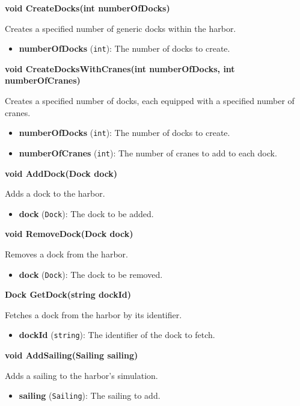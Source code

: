 \documentclass[12pt]{article}
\begin{document}
\textbf{void CreateDocks(int numberOfDocks)}

Creates a specified number of generic docks within the harbor.

\begin{itemize}
    \item \textbf{numberOfDocks} (\texttt{int}): The number of docks to create.
\end{itemize}

\textbf{void CreateDocksWithCranes(int numberOfDocks, int numberOfCranes)}

Creates a specified number of docks, each equipped with a specified number of cranes.

\begin{itemize}
    \item \textbf{numberOfDocks} (\texttt{int}): The number of docks to create.
    \item \textbf{numberOfCranes} (\texttt{int}): The number of cranes to add to each dock.
\end{itemize}

\textbf{void AddDock(Dock dock)}

Adds a dock to the harbor.

\begin{itemize}
    \item \textbf{dock} (\texttt{Dock}): The dock to be added.
\end{itemize}

\textbf{void RemoveDock(Dock dock)}

Removes a dock from the harbor.

\begin{itemize}
    \item \textbf{dock} (\texttt{Dock}): The dock to be removed.
\end{itemize}

\textbf{Dock GetDock(string dockId)}

Fetches a dock from the harbor by its identifier.

\begin{itemize}
    \item \textbf{dockId} (\texttt{string}): The identifier of the dock to fetch.
\end{itemize}

\textbf{void AddSailing(Sailing sailing)}

Adds a sailing to the harbor's simulation.

\begin{itemize}
    \item \textbf{sailing} (\texttt{Sailing}): The sailing to add.
\end{itemize}
\end{document}
